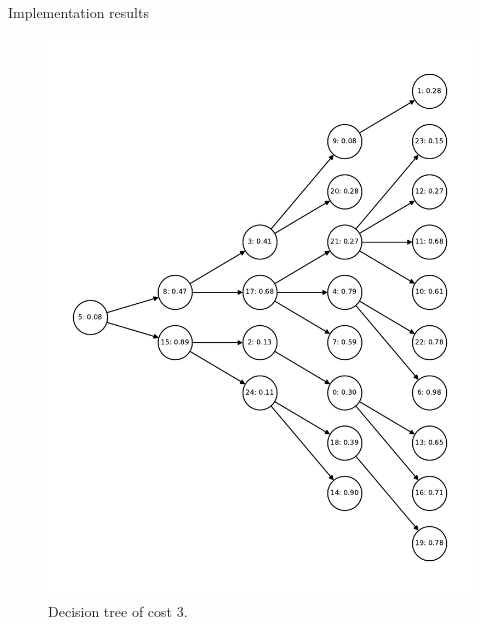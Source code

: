 \begin{frame}[allowframebreaks]{Implementation results}
\begin{figure}[htp]
{\begin{minipage}[t]{0.49\textwidth}
            \includegraphics[width=\textwidth]{figures/computed/dt_25.pdf}
            \caption{Decision tree of cost 3.}
        \end{minipage}
        }
    \end{figure}


\end{frame}
